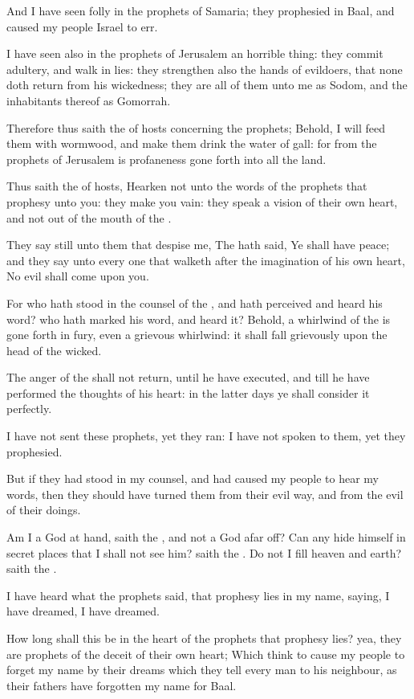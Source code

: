 \verse And I have seen folly in the prophets of Samaria; they prophesied in Baal, and caused my people Israel to err.

\verse I have seen also in the prophets of Jerusalem an horrible thing: they commit adultery, and walk in lies: they strengthen also the hands of evildoers, that none doth return from his wickedness; they are all of them unto me as Sodom, and the inhabitants thereof as Gomorrah.

\verse Therefore thus saith the \LORD of hosts concerning the prophets; Behold, I will feed them with wormwood, and make them drink the water of gall: for from the prophets of Jerusalem is profaneness gone forth into all the land.

\verse Thus saith the \LORD of hosts, Hearken not unto the words of the prophets that prophesy unto you: they make you vain: they speak a vision of their own heart, and not out of the mouth of the \LORD.

\verse They say still unto them that despise me, The \LORD hath said, Ye shall have peace; and they say unto every one that walketh after the imagination of his own heart, No evil shall come upon you.

\verse For who hath stood in the counsel of the \LORD, and hath perceived and heard his word? who hath marked his word, and heard it?  \verse Behold, a whirlwind of the \LORD is gone forth in fury, even a grievous whirlwind: it shall fall grievously upon the head of the wicked.

\verse The anger of the \LORD shall not return, until he have executed, and till he have performed the thoughts of his heart: in the latter days ye shall consider it perfectly.

\verse I have not sent these prophets, yet they ran: I have not spoken to them, yet they prophesied.

\verse But if they had stood in my counsel, and had caused my people to hear my words, then they should have turned them from their evil way, and from the evil of their doings.

\verse Am I a God at hand, saith the \LORD, and not a God afar off?  \verse Can any hide himself in secret places that I shall not see him?  saith the \LORD. Do not I fill heaven and earth? saith the \LORD.

\verse I have heard what the prophets said, that prophesy lies in my name, saying, I have dreamed, I have dreamed.

\verse How long shall this be in the heart of the prophets that prophesy lies? yea, they are prophets of the deceit of their own heart; \verse Which think to cause my people to forget my name by their dreams which they tell every man to his neighbour, as their fathers have forgotten my name for Baal.

